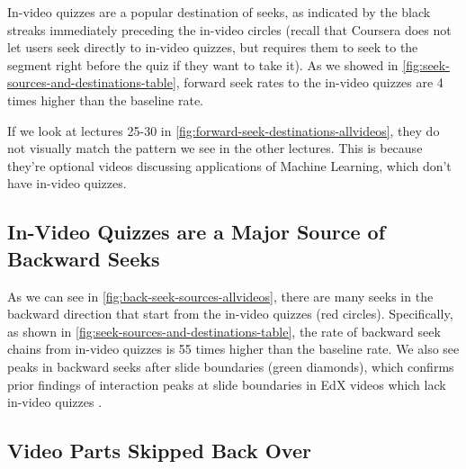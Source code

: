 \documentclass{sigchi}
\begin{document}
In-video quizzes are a popular destination of seeks, as indicated by the black streaks immediately preceding the in-video circles (recall that Coursera does not let users seek directly to in-video quizzes, but requires them to seek to the segment right before the quiz if they want to take it). As we showed in \autoref{fig:seek-sources-and-destinations-table}, forward seek rates to the in-video quizzes are 4 times higher than the baseline rate.


If we look at lectures 25-30 in \autoref{fig:forward-seek-destinations-allvideos}, they do not visually match the pattern we see in the other lectures. This is because they're optional videos discussing applications of Machine Learning, which don't have in-video quizzes. %


\subsection{In-Video Quizzes are a Major Source of Backward Seeks}

As we can see in \autoref{fig:back-seek-sources-allvideos}, there are many seeks in the backward direction that start from the in-video quizzes (red circles). Specifically, as shown in \autoref{fig:seek-sources-and-destinations-table}, the rate of backward seek chains from in-video quizzes is 55 times higher than the baseline rate. We also see peaks in backward seeks after slide boundaries (green diamonds), which confirms prior findings of interaction peaks at slide boundaries in EdX videos which lack in-video quizzes \cite{juho}.

\subsection{Video Parts Skipped Back Over}
\end{document}
